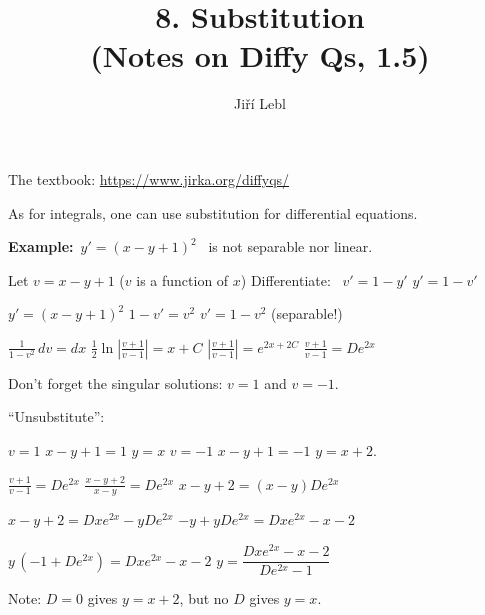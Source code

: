 \documentclass[10pt,aspectratio=169]{beamer}
\author{Ji\v{r}\'i Lebl}
\institute[OSU]{%
Oklahoma State University%
}
\title{8. Substitution\\(Notes on Diffy Qs, 1.5)}
\date{}
\begin{document}
\begin{frame}
\titlepage


\begin{center}
The textbook: \url{https://www.jirka.org/diffyqs/}
\end{center}
\end{frame}

\begin{frame}
As for integrals, one can use substitution for differential equations.

\medskip
\pause

\textbf{Example:}~$y' = {(x-y+1)}^2$~ is not separable nor linear.

\medskip
\pause

Let $v = x-y+1$
\pause
\quad
($v$ is a function of $x$)
\qquad
\pause
Differentiate: ~$v' = 1 - y'$
\pause
\wthus
$y' = 1-v'$

\medskip
\pause

$y' = {(x-y+1)}^2$
\wthus
$1-v' = v^2$
\pause
\wthus
$v' = 1-v^2$
\quad
\pause
(separable!)

\medskip
\pause

$\displaystyle
\frac{1}{1-v^2} \,dv = dx$
\pause
\wthus
$\displaystyle
\frac{1}{2} \ln \left\lvert  \frac{v+1}{v-1} \right\rvert = x + C$
\pause
\wthus
$\displaystyle
\left\lvert \frac{v+1}{v-1} \right\rvert = e^{2x + 2C}$
\pause
\wthus
$\displaystyle
\frac{v+1}{v-1} = D e^{2x}$

\medskip
\pause

Don't forget the singular solutions: $v=1$ and $v=-1$.

\medskip
\pause

``Unsubstitute'':

\medskip
\pause

$v=1$
\pause
\wthus
$x-y+1=1$
\pause
\wthus $y=x$
\pause
\hfill
$v=-1$
\pause
\wthus
$x-y+1=-1$
\pause
\wthus
$y=x+2$.

\medskip
\pause

$\displaystyle
\frac{v+1}{v-1} = D e^{2x}$
\pause
\wthus
$\displaystyle
\frac{x-y+2}{x-y} = D e^{2x}$
\pause
\wthus
$x-y+2 = (x-y)D e^{2x}$

\medskip

\pause
\wthus
$x-y+2 = Dx e^{2x}-yD e^{2x}$
\pause
\wthus
$-y + yD e^{2x} = Dx e^{2x} - x - 2$

\medskip

\pause
\wthus
$y\,(-1+ D e^{2x}) = Dx e^{2x} - x - 2$
\pause
\wthus
$y  = \dfrac{Dx e^{2x} - x - 2}{D e^{2x}-1}$

\medskip
\pause

Note: $D=0$ gives $y=x+2$, but no $D$ gives $y=x$.

\end{frame}
\end{document}
